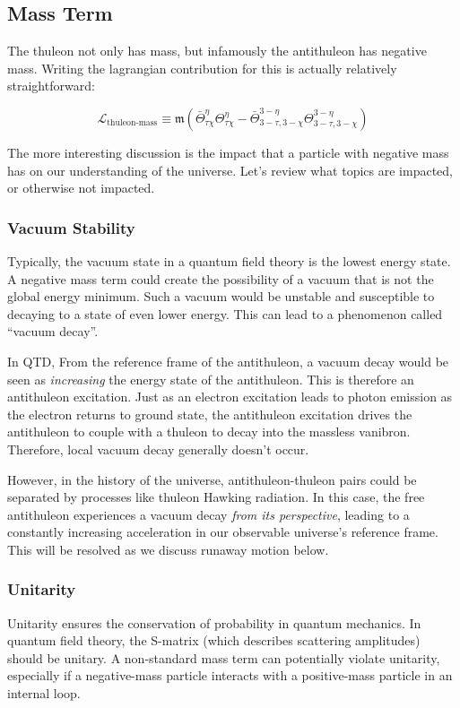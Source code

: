 \subsection{Mass Term}
The thuleon not only has mass, but infamously the antithuleon has negative mass. Writing the lagrangian contribution for this is actually relatively straightforward:
\begin{definition}
  \[
    \mathcal{L}_{\text{thuleon-mass}} \equiv \mathfrak{m} \left(
    \bar{\Theta}^{\eta}_{\tau \chi}\Theta^{\eta}_{\tau \chi} - \bar{\Theta}^{3-\eta}_{3-\tau,3-\chi}\Theta^{3-\eta}_{3-\tau,3-\chi}
    \right)
  \]
\end{definition}

The more interesting discussion is the impact that a particle with negative mass has on our understanding of the universe. Let's review what topics are impacted, or otherwise not impacted.

\subsubsection{Vacuum Stability}
Typically, the vacuum state in a quantum field theory is the lowest energy state. A negative mass term could create the possibility of a vacuum that is not the global energy minimum. Such a vacuum would be unstable and susceptible to decaying to a state of even lower energy. This can lead to a phenomenon called ``vacuum decay''.

In QTD, From the reference frame of the antithuleon, a vacuum decay would be seen as \textit{increasing} the energy state of the antithuleon. This is therefore an antithuleon excitation. Just as an electron excitation leads to photon emission as the electron returns to ground state, the antithuleon excitation drives the antithuleon to couple with a thuleon to decay into the massless vanibron. Therefore, local vacuum decay generally doesn't occur.

However, in the history of the universe, antithuleon-thuleon pairs could be separated by processes like thuleon Hawking radiation. In this case, the free antithuleon experiences a vacuum decay \textit{from its perspective}, leading to a constantly increasing acceleration in our observable universe's reference frame. This will be resolved as we discuss runaway motion below.

\subsubsection{Unitarity}
Unitarity ensures the conservation of probability in quantum mechanics. In quantum field theory, the S-matrix (which describes scattering amplitudes) should be unitary. A non-standard mass term can potentially violate unitarity, especially if a negative-mass particle interacts with a positive-mass particle in an internal loop.

